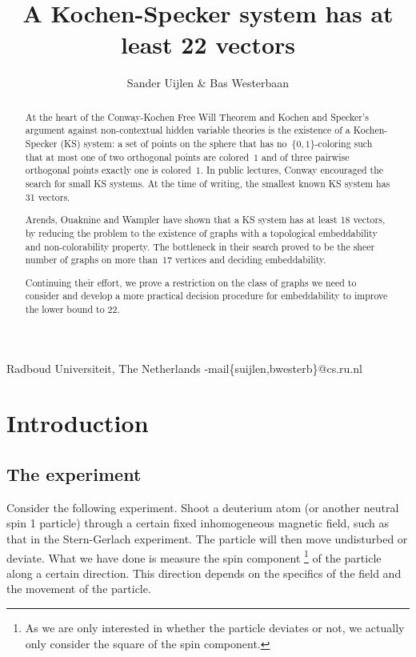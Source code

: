 \documentclass{report}
\begin{document}
\title{A Kochen-Specker system has at least 22 vectors}
\author{Sander Uijlen \& Bas Westerbaan}{Radboud Universiteit, The Netherlands}
\E-mail{\{suijlen,bwesterb\}@cs.ru.nl}

\begin{abstract}
    At the heart of the Conway-Kochen
    Free Will Theorem and Kochen and Specker's
        argument against non-contextual hidden variable theories
    is the existence of a Kochen-Specker (KS) system:
    a set of points on the sphere
    that has no~$\{0,1\}$-coloring such that
    at most one of two orthogonal points are colored~$1$
    and of three pairwise orthogonal points exactly one
    is colored~$1$.
    In public lectures, Conway encouraged the search for small
    KS systems.
    At the time of writing, the smallest known
    KS system has 31 vectors.  

    Arends, Ouaknine and Wampler have shown that a KS system has at least
    18 vectors, by reducing the problem to the existence of graphs
    with a topological embeddability and non-colorability property.
    The bottleneck in their search
    proved to be the sheer number of graphs on more than~$17$
    vertices and deciding embeddability.

    Continuing their effort, we prove a restriction on the class of graphs
    we need to consider and develop a more practical decision procedure for
    embeddability to improve the lower bound to 22.
\end{abstract}

\clearpage
\section{Introduction}

\subsection{The experiment}
Consider the following experiment.  Shoot a deuterium
atom (or another neutral spin 1 particle)
through a certain fixed inhomogeneous magnetic field,
such as that in the Stern-Gerlach experiment.
The particle will then move undisturbed or deviate.
What we have done is measure the spin component%
\footnote{%
As we are only interested in whether the particle deviates or
    not, we actually only consider the square of the spin component.}
 of the particle
along a certain direction.  This direction depends on the specifics of the
field and the movement of the particle.
\end{document}
